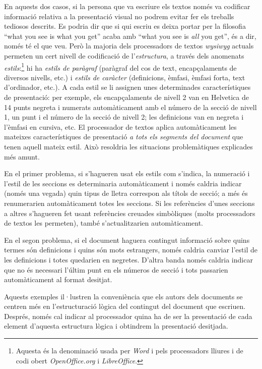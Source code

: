   En aquests dos casos, si la persona que va escriure els textos només
  va codificar informació relativa a la presentació visual no podrem
  evitar fer els treballs tediosos descrits. Es podria dir que si qui
  escriu es deixa portar per la filosofia ``what you see is what you
  get'' acaba amb ``what you see is \emph{all} you get'', és a dir,
  només té el que veu. Però la majoria dels processadors de textos
  \emph{wysiwyg} actuals permeten un cert nivell de codificació de
  l'\emph{estructura}, a través dels anomenats
  \emph{estils}:\footnote{Aquesta és la denominació usada per
    \emph{Word} i pels processadors lliures i de codi obert
    \emph{OpenOffice.org} i \emph{LibreOffice}.} hi ha \emph{estils de
    paràgraf} (paràgraf del cos de text, encapçalaments de diversos
  nivells, etc.) i \emph{estils de caràcter} (definicions, èmfasi,
  èmfasi forta, text d'ordinador, etc.).\label{pg:estil} A cada estil
  se li assignen unes determinades característiques de presentació:
  per exemple, els encapçalaments de nivell 2 van en Helvetica de 14
  punts negreta i numerats automàticament amb el número de la secció
  de nivell 1, un punt i el número de la secció de nivell 2; les
  definicions van en negreta i l'èmfasi en cursiva, etc. El
  processador de textos aplica automàticament les mateixes
  característiques de presentació \emph{a tots els segments del
    document} que tenen aquell mateix estil.  Això resoldria les
  situacions problemàtiques explicades més amunt.
  
  En el primer problema, si s'hagueren usat els estils com s'indica,
  la numeració i l'estil de les seccions es determinaria
  automàticament i només caldria indicar (només una vegada) quin tipus
  de lletra correspon als títols de secció; a més és renumerarien
  automàticament totes les seccions. Si les referències d'unes
  seccions a altres s'hagueren fet usant referències creuades
  simbòliques (molts processadors de textos les permeten), també
  s'actualitzarien automàticament.
  
  En el segon problema, si el document haguera contingut informació
  sobre quins termes són definicions i quins són mots estrangers,
  només caldria canviar l'estil de les definicions i totes quedarien
  en negretes. D'altra banda només caldria indicar que no és necessari
  l'últim punt en els números de secció i tots passarien
  automàticament al format desitjat.
  
  Aquests exemples il·lustren la conveniència que els autors dels
  documents se centren més en l'estructuració lògica del contingut del
  document que escriuen. Després, només cal indicar al processador
  quina ha de ser la presentació de cada element d'aquesta estructura
  lògica i obtindrem la presentació desitjada.


